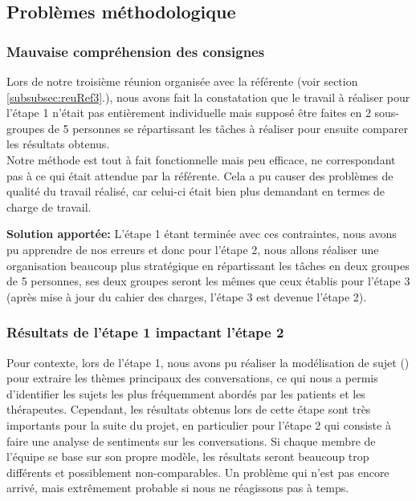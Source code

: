 \documentclass[12pt,a4paper]{article}
\begin{document}
\pagebreak
\subsection{Problèmes méthodologique}
\subsubsection{Mauvaise compréhension des consignes}\label{subsubsec:probMethoConsignes}
Lors de notre troisième réunion organisée avec la référente (voir section \ref{subsubsec:reuRef3}.),
nous avons fait la constatation que le travail à réaliser pour l'étape 1 n'était pas entièrement individuelle mais supposé être faites en 2 sous-groupes 
de 5 personnes se répartissant les tâches à réaliser pour ensuite comparer les résultats obtenus.\\
Notre méthode est tout à fait fonctionnelle mais peu efficace, ne correspondant pas à ce qui était attendue par la référente.
Cela a pu causer des problèmes de qualité du travail réalisé, car celui-ci était bien plus demandant en termes de charge de travail. \smallbreak 

\hspace{0.5cm}\textbf{Solution apportée:} L'étape 1 étant terminée avec ces contraintes, nous avons pu apprendre de nos
erreurs et donc pour l'étape 2, nous allons réaliser une organisation beaucoup plus stratégique en répartissant 
les tâches en deux groupes de 5 personnes, ses deux groupes seront les mêmes que ceux établis pour l'étape 3 (après mise à jour du cahier des charges,
l'étape 3 est devenue l'étape 2). 

\subsubsection{Résultats de l'étape 1 impactant l'étape 2}\label{subsubsec:probMethoResEtape1}
Pour contexte, lors de l'étape 1, nous avons pu réaliser la modélisation de sujet () 
pour extraire les thèmes principaux des conversations, ce qui nous a permis d'identifier les sujets les plus 
fréquemment abordés par les patients et les thérapeutes. 
Cependant, les résultats obtenus lors de cette étape sont très importants pour la suite du projet, 
en particulier pour l'étape 2 qui consiste à faire une analyse de sentiments sur les conversations. 
Si chaque membre de l'équipe se base sur son propre modèle, les résultats seront beaucoup trop différents
et possiblement non-comparables.\smallbreak
Un problème qui n'est pas encore arrivé, mais extrêmement probable si nous ne réagissons pas à temps.
\end{document}
